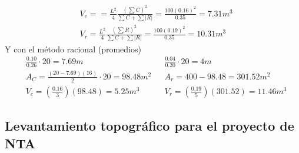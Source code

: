 \begin{align*}
    &V_c ==\frac{L^2}{4}\frac{\left(\sum C\right)^2}{\sum C + \sum\left\lvert R\right\rvert } = \frac{100(0.16)^2}{0.35} =7.31m^3\\
    &V_r = \frac{L^2}{4} \frac{\left(\sum R\right)^2}{\sum C + \sum\left\lvert R\right\rvert} = \frac{100(0.19)^2}{0.35} =10.31m^3
\end{align*}
Y con el método racional (promedios)
\begin{align*}
    &\frac{0.10}{0.26} \cdot 20 = 7.69 m&&\frac{0.04}{0.20} \cdot 20 = 4m \\
    &A_C = \frac{(20 - 7.69)(16)}{2}\cdot 20 = 98.48 m^2&& A_r = 400 - 98.48 = 301.52 m^2\\
    &V_c = \left(\frac{0.16}{3}\right)\left(98.48\right) = 5.25 m^3&& V_r = \left(\frac{0.19}{5}\right)\left(301.52\right) = 11.46 m^3
\end{align*}

\subsection{Levantamiento topográfico para el proyecto de NTA}
